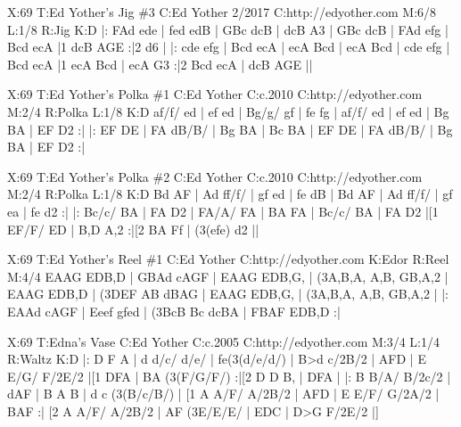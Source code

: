 \documentclass[letterpaper]{article}
\begin{document}
\begin{abc}[name]
X:69
T:Ed Yother's Jig \#3
C:Ed Yother 2/2017
C:http://edyother.com
M:6/8
L:1/8
R:Jig
K:D
|: FAd ede | fed edB | GBc dcB | dcB A3 |
GBc dcB | FAd efg | Bcd ecA |1 dcB AGE :|2 d6 | 
|: cde efg | Bcd ecA | ecA Bcd | ecA Bcd | 
cde efg | Bcd ecA |1 ecA Bcd | ecA G3 :|2  Bcd ecA | dcB AGE ||
\end{abc}

\begin{abc}[name]
X:69
T:Ed Yother's Polka \#1
C:Ed Yother
C:c.2010
C:http://edyother.com
M:2/4
R:Polka
L:1/8
K:D
af/f/ ed | ef ed | Bg/g/ gf | fe fg |
af/f/ ed | ef ed | Bg BA | EF D2 :|
|: EF DE | FA dB/B/ | Bg BA | Bc BA |
EF DE | FA dB/B/ | Bg BA | EF D2 :|
\end{abc}

\begin{abc}[name]
X:69
T:Ed Yother's Polka \#2
C:Ed Yother
C:c.2010
C:http://edyother.com
M:2/4
R:Polka
L:1/8
K:D
Bd AF | Ad ff/f/ | gf ed | fe dB |
Bd AF | Ad ff/f/ | gf ea | fe d2 :|
|: Bc/c/ BA | FA D2 | FA/A/ FA | BA FA |
Bc/c/ BA | FA D2 |[1 EF/F/ ED | B,D A,2 :|[2 BA Ff | (3(efe) d2 || 
\end{abc}

\begin{abc}[name]
X:69
T:Ed Yother's Reel \#1
C:Ed Yother
C:http://edyother.com
K:Edor
R:Reel
M:4/4
EAAG EDB,D | GBAd cAGF | EAAG EDB,G, | (3A,B,A, A,B, GB,A,2 |
EAAG EDB,D | (3DEF AB dBAG | EAAG EDB,G, | (3A,B,A, A,B, GB,A,2 |
|:  EAAd cAGF | Eeef gfed | (3BcB Bc dcBA | FBAF EDB,D :|

\end{abc}

\begin{abc}[name]
X:69
T:Edna's Vase
C:Ed Yother
C:c.2005
C:http://edyother.com
M:3/4
L:1/4
R:Waltz
K:D
|:  D F A | d d/c/ d/e/ | fe(3(d/e/d/) |  B>d c/2B/2 |
 AFD | E E/G/ F/2E/2 |[1  DFA | BA (3(F/G/F/) :|[2  D D B, |  DFA |
|:  B B/A/ B/2c/2 | dAF | B A B | d c (3(B/c/B/) |
[1 A A/F/ A/2B/2 | AFD | E E/F/ G/2A/2 | BAF :|
[2 A A/F/ A/2B/2 | AF (3E/E/E/ |  EDC |  D>G F/2E/2 |]
\end{abc}
\end{document}
